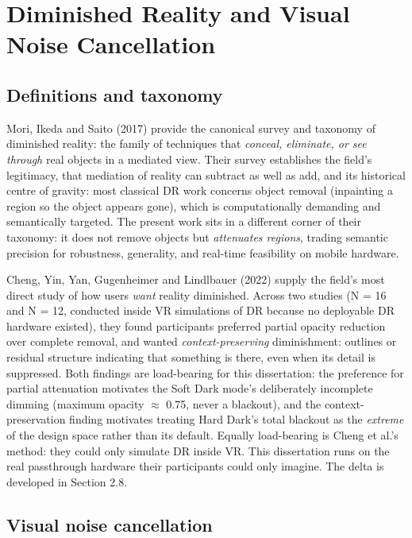 \section{Diminished Reality and Visual Noise Cancellation}

\subsection{Definitions and taxonomy}

Mori, Ikeda and Saito (2017) provide the canonical survey and taxonomy of diminished reality: the
family of techniques that \textit{conceal, eliminate, or see through} real objects in a mediated view. Their
survey establishes the field's legitimacy, that mediation of reality can subtract as well as add,
and its historical centre of gravity: most classical DR work concerns object removal (inpainting a
region so the object appears gone), which is computationally demanding and semantically targeted.
The present work sits in a different corner of their taxonomy: it does not remove objects but
\textit{attenuates regions}, trading semantic precision for robustness, generality, and real-time
feasibility on mobile hardware.

Cheng, Yin, Yan, Gugenheimer and Lindlbauer (2022) supply the field's most direct study of how users
\textit{want} reality diminished. Across two studies (N = 16 and N = 12, conducted inside VR simulations of
DR because no deployable DR hardware existed), they found participants preferred partial opacity
reduction over complete removal, and wanted \textit{context-preserving} diminishment: outlines or residual
structure indicating that something is there, even when its detail is suppressed. Both findings are
load-bearing for this dissertation: the preference for partial attenuation motivates the Soft Dark
mode's deliberately incomplete dimming (maximum opacity $\approx$ 0.75, never a blackout), and the
context-preservation finding motivates treating Hard Dark's total blackout as the \textit{extreme} of the
design space rather than its default. Equally load-bearing is Cheng et al.'s method: they could only
simulate DR inside VR. This dissertation runs on the real passthrough hardware their participants
could only imagine. The delta is developed in Section 2.8.

\subsection{Visual noise cancellation}

